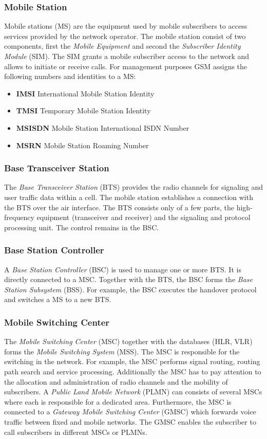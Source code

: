 \documentclass[master,english]{hgbthesis}
\begin{document}
\subsubsection{Mobile Station}
Mobile stations (MS) are the equipment used by mobile subscribers to access services provided by the network operator. The mobile station consist of two components, first the \emph{Mobile Equipment} and second the \emph{Subscriber Identity Module} (SIM). The SIM grants a mobile subscriber access to the network and allows to initiate or receive calls.
For management purposes GSM assigns the following numbers and identities to a MS:
\begin{itemize}
	\item \textbf{IMSI} International Mobile Station Identity
	\item \textbf{TMSI} Temporary Mobile Station Identity
	\item \textbf{MSISDN} Mobile Station International ISDN Number
	\item \textbf{MSRN} Mobile Station Roaming Number
\end{itemize}
\subsubsection{Base Transceiver Station}
The \emph{Base Transceiver Station} (BTS) provides the radio channels for signaling and user traffic data within a cell. The mobile station establishes a connection with the BTS over the air interface. The BTS consists only of a few parts, the high-frequency equipment (transceiver and receiver) and the signaling and protocol processing unit. The control remains in the BSC.
\subsubsection{Base Station Controller}
A \emph{Base Station Controller} (BSC) is used to manage one or more BTS. It is directly connected to a MSC. Together with the BTS, the BSC forms the \emph{Base Station Subsystem} (BSS). For example, the BSC executes the handover protocol and switches a MS to a new BTS.
\subsubsection{Mobile Switching Center}
The \emph{Mobile Switching Center} (MSC) together with the databases (HLR, VLR) forms the \emph{Mobile Switching System} (MSS). The MSC is responsible for the switching in the network. For example, the MSC performs signal routing, routing path search and service processing. Additionally the MSC has to pay attention to the allocation and administration of radio channels and the mobility of subscribers. A \emph{Public Land Mobile Network} (PLMN) can consists of several MSCs where each is responsible for a dedicated area.
Furthermore, the MSC is connected to a \emph{Gateway Mobile Switching Center} (GMSC) which forwards voice traffic between fixed and mobile networks. The GMSC enables the subscriber to call subscribers in different MSCs or PLMNs.
\end{document}
